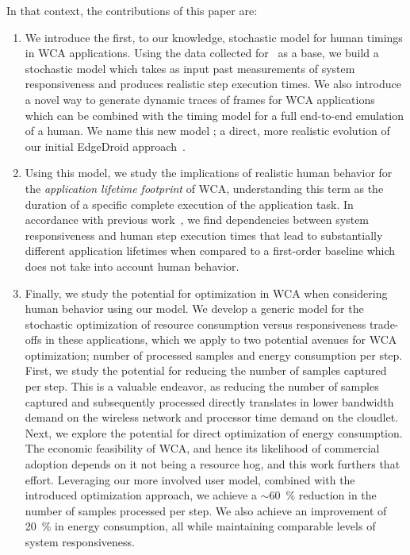 In that context, the contributions of this paper are:
\begin{enumerate}
    \item\label{item:contrib:model} We introduce the first, to our knowledge, stochastic model for human timings in \gls{WCA} applications.
    Using the data collected for~\cite{olguinmunoz2021impact} as a base, we build a stochastic model which takes as input past measurements of system responsiveness and produces realistic step execution times.
    We also introduce a novel way to generate dynamic traces of frames for \gls{WCA} applications which can be combined with the timing model for a full end-to-end emulation of a human.
    We name this new model \emph{\edgedroid}; a direct, more realistic evolution of our initial EdgeDroid approach~\cite{olguinmunoz2018demoscaling,olguinmunoz2019edgedroid}.
    \item\label{item:contrib:footprint} Using this model, we study the implications of realistic human behavior for the \emph{application lifetime footprint} of \gls{WCA}, understanding this term as the duration of a specific complete execution of the application task.
    In accordance with previous work~\cite{olguinmunoz2021impact}, we find dependencies between system responsiveness and human step execution times that lead to substantially different application lifetimes when compared to a first-order baseline which does not take into account human behavior.
    \item\label{item:contrib:optimization} Finally, we study the potential for optimization in \gls{WCA} when considering human behavior using our model.
    We develop a generic model for the stochastic optimization of resource consumption versus responsiveness trade-offs in these applications, which we apply to two potential avenues for \gls{WCA} optimization; number of processed samples and energy consumption per step.
    First, we study the potential for reducing the number of samples captured per step.
    This is a valuable endeavor, as reducing the number of samples captured and subsequently processed directly translates in lower bandwidth demand on the wireless network and processor time demand on the cloudlet.
    Next, we explore the potential for direct optimization of energy consumption.
    The economic feasibility of WCA, and hence its likelihood of commercial adoption depends on it not being a resource hog, and this work furthers that effort.
    Leveraging our more involved user model, combined with the introduced optimization approach, we achieve a \ensuremath{\sim}\SI{60}{\percent} reduction in the number of samples processed per step.
    We also achieve an improvement of \SI{20}{\percent} in energy consumption, all while maintaining comparable levels of system responsiveness.
\end{enumerate}

